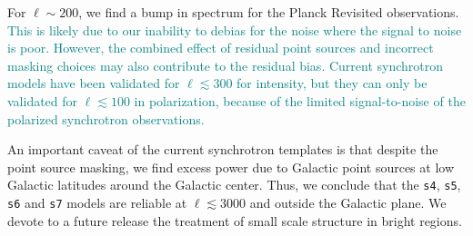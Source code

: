 \documentclass[twocolumn]{aastex631}
\newcommand{\sg}[1]{\textcolor{teal}{#1}}
\begin{document}
For $\ell \sim 200$, we find a bump in spectrum for the Planck Revisited observations. 
\sg{This is likely due to our inability to debias for the noise where the signal to noise is poor. However, the combined effect of residual point sources and incorrect masking choices may also contribute to the residual bias. Current synchrotron models have been validated for $\ell \lesssim 300$ for intensity, but they can only be validated for $\ell \lesssim 100$ in polarization, because of the limited signal-to-noise of the polarized synchrotron observations.}

An important caveat of the current synchrotron templates is that despite the point source masking, we find excess power due to Galactic point sources at low  Galactic  latitudes around the Galactic center. Thus, we conclude that the \texttt{s4}, \texttt{s5}, \texttt{s6} and \texttt{s7} models are reliable at $\ell \lesssim 3000$ and outside the Galactic plane. We devote to a future release the treatment of small scale structure in bright regions.
\end{document}
